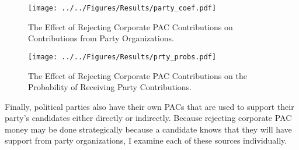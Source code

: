 \documentclass[12pt]{article}
\begin{document}
\begin{figure*}[!htb]
    \centering
    \begin{subfigure}[b]{0.65\textwidth}
        \centering
        \texttt{[image: ../../Figures/Results/party\_coef.pdf]}
        \caption{The Effect of Rejecting Corporate PAC Contributions on Contributions from Party Organizations.}
        \label{fig: party coefs}
    \end{subfigure}
    
    \begin{subfigure}[b]{0.65\textwidth}
        \centering
        \texttt{[image: ../../Figures/Results/prty\_probs.pdf]}
        \caption{The Effect of Rejecting Corporate PAC Contributions on the Probability of Receiving Party Contributions.}
        \label{fig: party probs}
    \end{subfigure}
    \caption{\textbf{The Effect of Rejecting Corporate PAC Contributions on Contributions and the Probability of Receiving Money from Political Parties.} These figures present the posterior distributions estimated for a candidate that pledges to reject corporate PAC contributions. The dot shows the median coefficient estimate and the intervals show the 50\% and 89\% highest density intervals. Figure \ref{fig: party coefs} shows that candidates that pledge to reject corporate PAC contributions experience a reduction in contributions from leadership PACs but also experience an increase in contributions from candidate committees. Figure \ref{fig: party probs} shows that rejecting corporate PAC contributions has no effect on the probability of receiving contributions from candidate committees, leadership PACs, or political parties. See Table \ref{tbl: party results} for the formal estimates.}
    \label{fig: party results}
\end{figure*}

Finally, political parties also have their own PACs that are used to support their party's candidates either directly or indirectly. Because rejecting corporate PAC money may be done strategically because a candidate knows that they will have support from party organizations, I examine each of these sources individually.  
\end{document}
